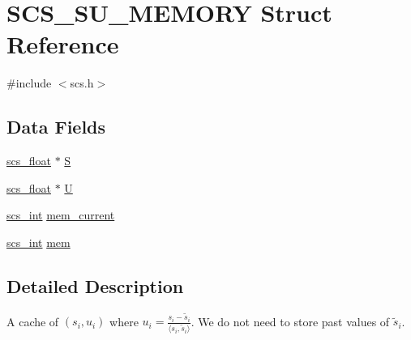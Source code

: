 \hypertarget{struct_s_c_s___s_u___m_e_m_o_r_y}{\section{S\-C\-S\-\_\-\-S\-U\-\_\-\-M\-E\-M\-O\-R\-Y Struct Reference}
\label{struct_s_c_s___s_u___m_e_m_o_r_y}
}


{\ttfamily \#include $<$scs.\-h$>$}

\subsection*{Data Fields}
\begin{DoxyCompactItemize}
\item 
\hyperlink{glbopts_8h_ad37836e6404bb2c3ae8adcc6290699b9}{scs\-\_\-float} $\ast$ \hyperlink{struct_s_c_s___s_u___m_e_m_o_r_y_aac89225fdd99a98b9e209a434a7fd037}{S}
\item 
\hyperlink{glbopts_8h_ad37836e6404bb2c3ae8adcc6290699b9}{scs\-\_\-float} $\ast$ \hyperlink{struct_s_c_s___s_u___m_e_m_o_r_y_a2597c54d6bdb9c4950b1c214f5b7f9f3}{U}
\item 
\hyperlink{glbopts_8h_a23c48a83ce0c58783595ad45ffcaf76b}{scs\-\_\-int} \hyperlink{struct_s_c_s___s_u___m_e_m_o_r_y_a8ff7e7d7b7c9aafbc1b230a62edec9d7}{mem\-\_\-current}
\item 
\hyperlink{glbopts_8h_a23c48a83ce0c58783595ad45ffcaf76b}{scs\-\_\-int} \hyperlink{struct_s_c_s___s_u___m_e_m_o_r_y_a2adf52e26eab40e526b88f0576713bad}{mem}
\end{DoxyCompactItemize}


\subsection{Detailed Description}
A cache of $(s_i, u_i)$ where $u_i = \frac{s_i - \tilde{s}_i}{\langle s_i, \tilde{s}_i\rangle}$. We do not need to store past values of $\tilde{s}_i$. 

